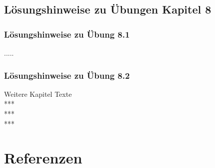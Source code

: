 \documentclass[12pt]{article}
\begin{document}
\subsection{Lösungshinweise zu Übungen Kapitel 8}

\subsubsection{Lösungshinweise zu Übung 8.1}
.....\\
\subsubsection{Lösungshinweise zu Übung 8.2}
Weitere Kapitel Texte \\
***\\
***\\
***

\newpage

\section{Referenzen}
\end{document}
